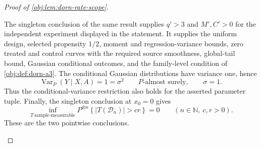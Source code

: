 \documentclass[11pt]{article}
\begin{document}
\begin{proof}[Proof of \cref{obj:lem:dorn-rate-scope}]
\begin{enumerate}
The singleton conclusion of the same result supplies \(q'>3\) and \(M',C'>0\) for the independent experiment displayed in the statement. It supplies the uniform design, selected propensity \(1/2\), moment and regression-variance bounds, zero treated and control curves with the required source smoothness, global-tail bound, Gaussian conditional outcomes, and the family-level condition of \cref{obj:def:dorn-a3}. The conditional Gaussian distributions have variance one, hence
\[
\operatorname{Var}_{P}(Y\mid X,A)=1=\sigma^2
\qquad P\text{-almost surely},
\qquad \sigma=1.
\]
Thus the conditional-variance restriction also holds for the asserted parameter tuple. Finally, the singleton conclusion at \(x_0=0\) gives
\[
\inf_{T\ \mathrm{sample\text{-}measurable}}
P^{\otimes n}\!\left\{|T(\mathcal D_n)|>cr\right\}
=0
\qquad(n\in\mathbb N,\ c,r>0).
\]
These are the two pointwise conclusions.
\end{enumerate}
\end{proof}




\end{document}
